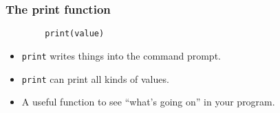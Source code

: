 \documentclass[notes]{beamer}
\begin{document}
	\begin{frame}[fragile]
		\frametitle{The print function}
		\begin{lstlisting}
		print(value)
		\end{lstlisting}
		\begin{itemize}
			\item \lstinline|print| writes things into the command prompt.
			\pause
			\item \lstinline|print| can print all kinds of values.
			\pause
			\item A useful function to see ``what's going on'' in your program.
		\end{itemize}
	\end{frame}
	
\end{document}
